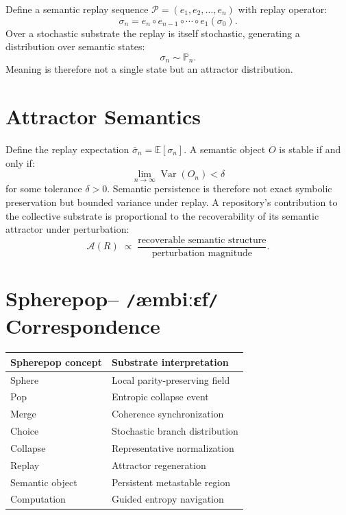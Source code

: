 \documentclass[12pt]{article}
\newcommand{\ambibf}{%
  \texttt{/}\textnormal{æmbiːɛf}\texttt{/}%
}
\begin{document}
Define a semantic replay sequence $\mathcal{P} = (e_1, e_2, \dots, e_n)$ with
replay operator:
\[
\sigma_n = e_n \circ e_{n-1} \circ \cdots \circ e_1(\sigma_0).
\]
Over a stochastic substrate the replay is itself stochastic, generating a
distribution over semantic states:
\[
\sigma_n \sim \mathbb{P}_n.
\]
Meaning is therefore not a single state but an attractor distribution.

\section{Attractor Semantics}

Define the replay expectation $\bar{\sigma}_n = \mathbb{E}[\sigma_n]$. A
semantic object $O$ is stable if and only if:
\[
\lim_{n \to \infty} \operatorname{Var}(O_n) < \delta
\]
for some tolerance $\delta > 0$. Semantic persistence is therefore not exact
symbolic preservation but bounded variance under replay. A repository's
contribution to the collective substrate is proportional to the recoverability
of its semantic attractor under perturbation:
\[
\mathcal{A}(R)
\;\propto\;
\frac{\text{recoverable semantic structure}}{\text{perturbation magnitude}}.
\]

\section{Spherepop--\ambibf{} Correspondence}

\medskip
\begin{center}
\begin{tabular}{ll}
\toprule
\textbf{Spherepop concept} & \textbf{Substrate interpretation} \\
\midrule
Sphere          & Local parity-preserving field \\
Pop             & Entropic collapse event \\
Merge           & Coherence synchronization \\
Choice          & Stochastic branch distribution \\
Collapse        & Representative normalization \\
Replay          & Attractor regeneration \\
Semantic object & Persistent metastable region \\
Computation     & Guided entropy navigation \\
\bottomrule
\end{tabular}
\end{center}
\medskip
\end{document}

